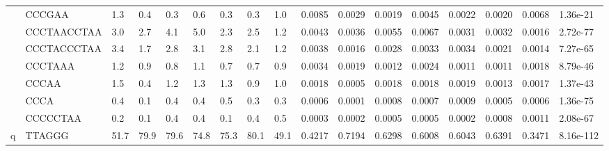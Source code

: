 \begin{landscape}
\begin{samepage}
\begin{table}[h!]
\begin{tabular}{lllllllllllllllll}
\textbf{}    & CCCGAA         & 1.3            & 0.4            & 0.3            & 0.6            & 0.3            & 0.3            & 1.0            & 0.0085         & 0.0029         & 0.0019         & 0.0045         & 0.0022         & 0.0020         & 0.0068         & 1.36e-21                   \\
\textbf{}    & CCCTAACCTAA    & 3.0            & 2.7            & 4.1            & 5.0            & 2.3            & 2.5            & 1.2            & 0.0043         & 0.0036         & 0.0055         & 0.0067         & 0.0031         & 0.0032         & 0.0016         & 2.72e-77                   \\
\textbf{}    & CCCTACCCTAA    & 3.4            & 1.7            & 2.8            & 3.1            & 2.8            & 2.1            & 1.2            & 0.0038         & 0.0016         & 0.0028         & 0.0033         & 0.0034         & 0.0021         & 0.0014         & 7.27e-65                   \\
\textbf{}    & CCCTAAA        & 1.2            & 0.9            & 0.8            & 1.1            & 0.7            & 0.7            & 0.9            & 0.0034         & 0.0019         & 0.0012         & 0.0024         & 0.0011         & 0.0011         & 0.0018         & 8.79e-46                   \\
\textbf{}    & CCCAA          & 1.5            & 0.4            & 1.2            & 1.3            & 1.3            & 0.9            & 1.0            & 0.0018         & 0.0005         & 0.0018         & 0.0018         & 0.0019         & 0.0013         & 0.0017         & 1.37e-43                   \\
\textbf{}    & CCCA           & 0.4            & 0.1            & 0.4            & 0.4            & 0.5            & 0.3            & 0.3            & 0.0006         & 0.0001         & 0.0008         & 0.0007         & 0.0009         & 0.0005         & 0.0006         & 1.36e-75                   \\
\textbf{}    & CCCCCTAA       & 0.2            & 0.1            & 0.4            & 0.4            & 0.1            & 0.4            & 0.5            & 0.0003         & 0.0002         & 0.0005         & 0.0005         & 0.0002         & 0.0008         & 0.0011         & 2.08e-67                   \\
q            & TTAGGG         & 51.7           & 79.9           & 79.6           & 74.8           & 75.3           & 80.1           & 49.1           & 0.4217         & 0.7194         & 0.6298         & 0.6008         & 0.6043         & 0.6391         & 0.3471         & 8.16e-112                  \\

\end{tabular}
\end{table}
\end{samepage}
\end{landscape}
